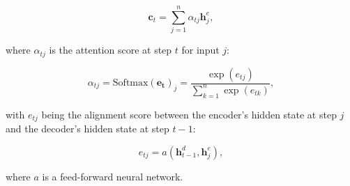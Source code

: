 \begin{equation}
    \bm{c}_t = \sum_{j=1}^n \alpha_{tj} \bm{h}^e_j,
\end{equation}

where $\alpha_{tj}$ is the attention score at step $t$ for input $j$:

\begin{equation}
    \alpha_{tj} = \mathrm{Softmax}(\bm{e_{t}})_j = \frac{\exp(e_{tj})}{\sum_{k=1}^n \exp(e_{tk})},
\end{equation}

with $e_{tj}$ being the alignment score between the encoder's hidden state at step $j$ and the decoder's hidden state at step $t-1$:

\begin{equation}
    e_{tj} = a(\bm{h}^d_{t-1}, \bm{h}^e_j),
\end{equation}

where $a$ is a feed-forward neural network.




